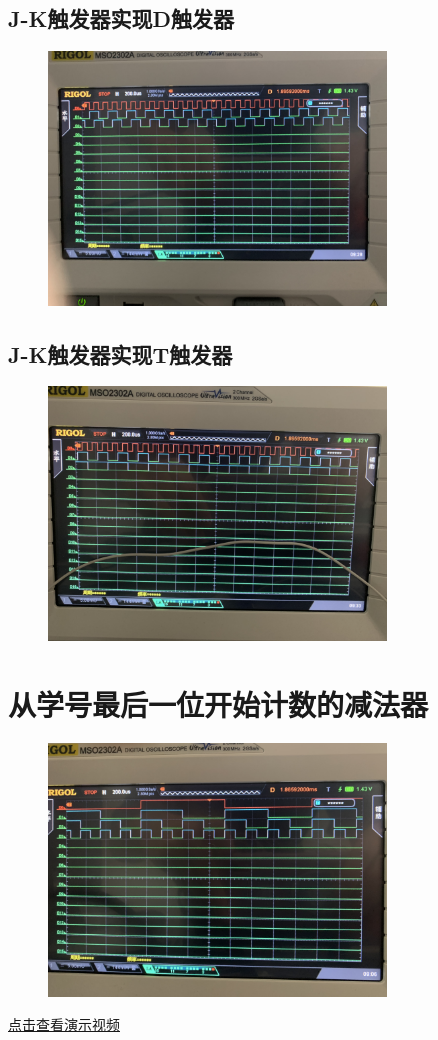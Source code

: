 \documentclass[UTF8, a4paper, 11pt]{article}
\begin{document}
\subsection{J-K触发器实现D触发器}
\begin{figure}[H]
    \centering
    \includegraphics[width=0.8\textwidth]{JK-D.png}
\end{figure}
\subsection{J-K触发器实现T触发器}
\begin{figure}[H]
    \centering
    \includegraphics[width=0.8\textwidth]{T.png}
\end{figure}
\section{从学号最后一位开始计数的减法器}
\begin{figure}[H]
    \centering
    \includegraphics[width=0.8\textwidth]{减法.png}
\end{figure}
\href{run:2.mp4}{点击查看演示视频} 
%
%
\end{document}
